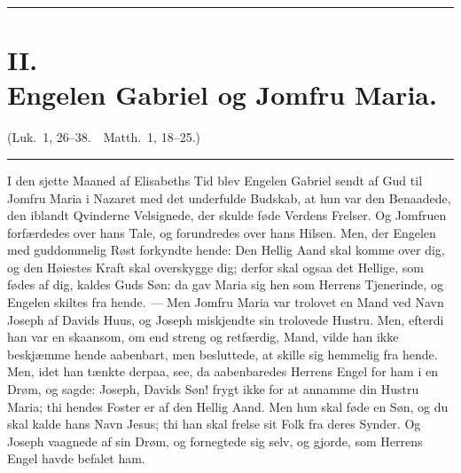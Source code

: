 \documentclass[12pt,a4paper]{book}
\begin{document}
\begin{center}
  \rule{0.38\textwidth}{0.4pt}
\end{center}

\section*{II.\\[4pt] Engelen Gabriel og Jomfru Maria.}

\begin{center}
  {\footnotesize (Luk.\ 1, 26--38.\ \ Matth.\ 1, 18--25.)}\\[10pt]
  \rule{0.12\textwidth}{0.4pt}
\end{center}

\begingroup\large
I den sjette Maaned af Elisabeths Tid blev Engelen Gabriel sendt af Gud til
Jomfru Maria i Nazaret med det underfulde Budskab, at hun var den Benaadede,
den iblandt Qvinderne Velsignede, der skulde føde Verdens Frelser. Og
Jomfruen forfærdedes over hans Tale, og
forundredes over hans Hilsen. Men, der Engelen med guddommelig Røst
forkyndte hende: Den Hellig Aand skal komme over dig, og den Høiestes Kraft
skal overskygge dig; derfor skal ogsaa det Hellige, som fødes af dig, kaldes
Guds Søn: da gav Maria sig hen som Herrens Tjenerinde, og Engelen skiltes
fra hende. --- Men Jomfru Maria var trolovet en Mand ved Navn Joseph af
Davids Huus, og Joseph miskjendte sin trolovede Hustru. Men, efterdi han var
en skaansom, om end streng og retfærdig, Mand, vilde han ikke beskjæmme
hende aabenbart, men besluttede, at skille sig hemmelig fra hende. Men, idet
han tænkte derpaa, see, da aabenbaredes Herrens Engel for ham i en Drøm, og
sagde: Joseph, Davids Søn! frygt ikke for at annamme din Hustru Maria; thi
hendes Foster er af den Hellig Aand. Men hun skal føde en Søn, og du skal
kalde hans Navn Jesus; thi han skal frelse sit Folk fra deres Synder. Og
Joseph vaagnede af sin Drøm, og fornegtede sig selv, og gjorde, som Herrens
Engel havde befalet ham.
\par\endgroup
\end{document}
